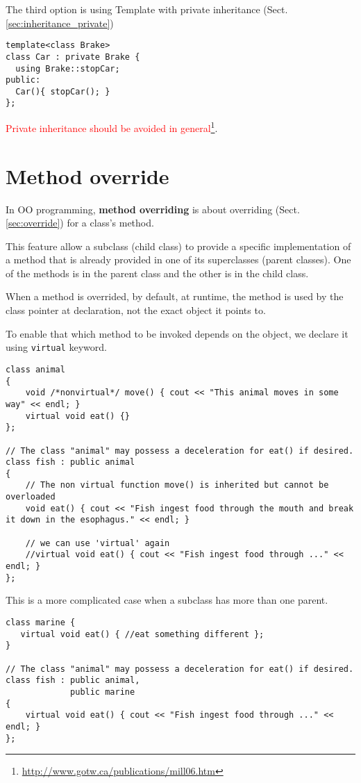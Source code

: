 The third option is using Template with private inheritance
(Sect.\ref{sec:inheritance_private})
\begin{verbatim}
template<class Brake>
class Car : private Brake {
  using Brake::stopCar;
public:
  Car(){ stopCar(); }
};
\end{verbatim}
\textcolor{red}{Private inheritance should be avoided in
general}\footnote{\url{http://www.gotw.ca/publications/mill06.htm}}.

\section{Method override}
\label{sec:method_overriding}

In OO programming, {\bf method overriding} is about overriding
(Sect.\ref{sec:override}) for a class's method.

This feature allow a subclass (child class) to provide a specific implementation
of a method that is already provided in one of its superclasses (parent
classes). One of the methods is in the parent class and the
other is in the child class.

When a method is overrided, by default, at runtime, the method is used by the
class pointer at declaration, not the exact object it points to.

To enable that which method to be invoked depends on the object, we declare it
using \verb!virtual! keyword.

\begin{lstlisting}
class animal
{
    void /*nonvirtual*/ move() { cout << "This animal moves in some way" << endl; }
    virtual void eat() {}
};

// The class "animal" may possess a deceleration for eat() if desired.
class fish : public animal
{
    // The non virtual function move() is inherited but cannot be overloaded
    void eat() { cout << "Fish ingest food through the mouth and break it down in the esophagus." << endl; }
    
    // we can use 'virtual' again
    //virtual void eat() { cout << "Fish ingest food through ..." << endl; } 
};
\end{lstlisting}

This is a more complicated case when a subclass has more than one parent.
\begin{lstlisting}
class marine {
   virtual void eat() { //eat something different };
}

// The class "animal" may possess a deceleration for eat() if desired.
class fish : public animal,
             public marine
{
    virtual void eat() { cout << "Fish ingest food through ..." << endl; } 
};
\end{lstlisting}


